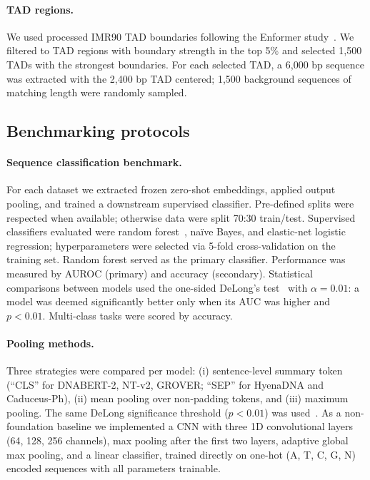 \documentclass[11pt,a4paper]{article}
\begin{document}
\paragraph{TAD regions.} We used processed IMR90 TAD boundaries following the Enformer study~\citep{avsec2021enformer}. We filtered to TAD regions with boundary strength in the top 5\% and selected 1{,}500 TADs with the strongest boundaries. For each selected TAD, a 6{,}000 bp sequence was extracted with the 2{,}400 bp TAD centered; 1{,}500 background sequences of matching length were randomly sampled.

\subsection{Benchmarking protocols}
\paragraph{Sequence classification benchmark.} For each dataset we extracted frozen zero-shot embeddings, applied output pooling, and trained a downstream supervised classifier. Pre-defined splits were respected when available; otherwise data were split 70:30 train/test. Supervised classifiers evaluated were random forest~\citep{breiman2001random}, na\"{i}ve Bayes, and elastic-net logistic regression; hyperparameters were selected via 5-fold cross-validation on the training set. Random forest served as the primary classifier. Performance was measured by AUROC (primary) and accuracy (secondary). Statistical comparisons between models used the one-sided DeLong's test~\citep{delong1988comparing} with $\alpha=0.01$: a model was deemed significantly better only when its AUC was higher and $p<0.01$. Multi-class tasks were scored by accuracy.
\paragraph{Pooling methods.} Three strategies were compared per model: (i) sentence-level summary token (``CLS'' for DNABERT-2, NT-v2, GROVER; ``SEP'' for HyenaDNA and Caduceus-Ph), (ii) mean pooling over non-padding tokens, and (iii) maximum pooling. The same DeLong significance threshold ($p<0.01$) was used~\citep{delong1988comparing}. As a non-foundation baseline we implemented a CNN with three 1D convolutional layers (64, 128, 256 channels), max pooling after the first two layers, adaptive global max pooling, and a linear classifier, trained directly on one-hot (A, T, C, G, N) encoded sequences with all parameters trainable.
\end{document}
